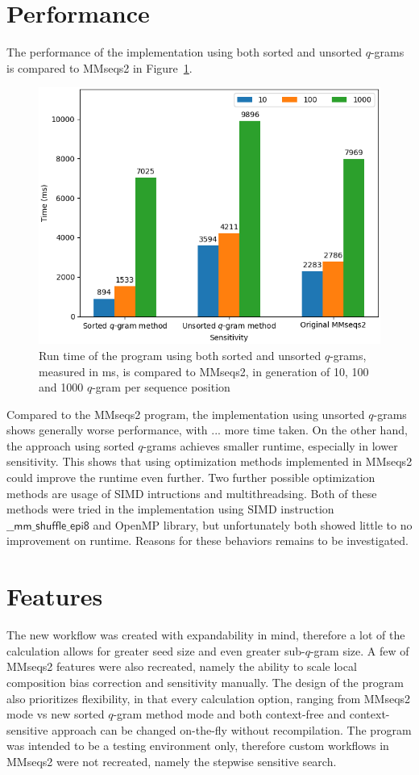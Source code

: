 \documentclass[twoside,a4paper,bsc]{master}
\newcommand{\Qgram}[1]{\(#1\)-gram}
\begin{document}
\section{Performance}
The performance of the implementation using both sorted and unsorted
\Qgram{q}s
is compared to MMseqs2 in Figure~\ref{fig:mmseqs2comp}.
\begin{figure}
\centering
\includegraphics[scale=0.6]{graphics/mmseqs2comp.png}
\caption{Run time of the program using both sorted and unsorted \Qgram{q}s,
measured in ms, is compared to MMseqs2, in generation of 10, 100 and 1000
\Qgram{q} per sequence position}
\label{fig:mmseqs2comp}
\end{figure}
Compared to the MMseqs2 program, the implementation using unsorted
\Qgram{q}s
shows generally worse performance, with ... more time taken. On the other
hand,
the approach using sorted \Qgram{q}s achieves smaller runtime, especially
in
lower sensitivity. This shows that using optimization methods implemented
in MMseqs2 could improve the runtime even further.
Two further possible optimization methods are usage of SIMD intructions and
multithreadsing. Both of these methods were tried in the implementation
using
SIMD instruction \(\mathsf{\_\_mm\_shuffle\_epi8}\) and OpenMP library, but
unfortunately both showed little to no improvement on runtime. Reasons for
these behaviors remains to be investigated.

\section{Features}
The new workflow was created with expandability in mind, therefore a lot of
the calculation allows for greater seed size and even greater sub-\Qgram{q}
size. A few of MMseqs2 features were also recreated, namely the ability to
scale local composition bias correction and sensitivity manually. The
design of the program also prioritizes flexibility, in that every
calculation option, ranging from MMseqs2 mode vs new sorted \Qgram{q}
method mode and both context-free and context-sensitive approach can be
changed on-the-fly without recompilation.
The program was intended to be a testing environment only, therefore custom
workflows in MMseqs2 were not recreated, namely the stepwise sensitive
search.
\end{document}
